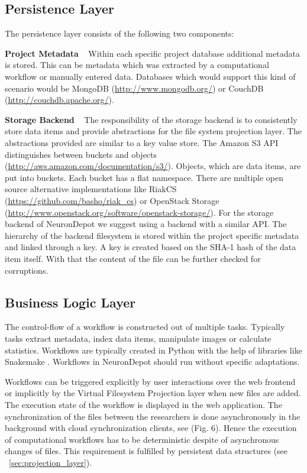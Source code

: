 \documentclass{frontiersSCNS} %
\begin{document}
\subsection{Persistence Layer}

The persistence layer consists of the following two components:

\textbf{Project Metadata} \texttt{  } Within each specific project database
additional metadata is stored. This can be metadata which was extracted by a
computational workflow or manually entered data. Databases which would support
this kind of scenario would be MongoDB (\url{http://www.mongodb.org/}) or
CouchDB (\url{http://couchdb.apache.org/}).

\textbf{Storage Backend} \texttt{  } The responsibility of the storage backend
is to consistently store data items and provide abstractions for the file
system projection layer. The abstractions provided are similar to a key value
store. The Amazon S3 API distinguishes between buckets and objects
(\url{http://aws.amazon.com/documentation/s3/}). Objects, which are data items,
are put into buckets. Each bucket has a flat namespace. There are multiple open
source alternative implementations like RiakCS
(\url{https://github.com/basho/riak\_cs}) or OpenStack Storage
(\url{http://www.openstack.org/software/openstack-storage/}). For the storage
backend of NeuronDepot we suggest using a backend with a similar API. The
hierarchy of the backend filesystem is stored within the project specific
metadata and linked through a key. A key is created based on the SHA-1 hash of
the data item itself. With that the content of the file can be further checked
for corruptions.


\subsection{Business Logic Layer}

The control-flow of a workflow is constructed out of multiple tasks. Typically
tasks extract metadata, index data items, manipulate images or calculate
statistics. Workflows are typically created in Python with the help of
libraries like Snakemake \citep{Koester2012}. Workflows in NeuronDepot should run
without specific adaptations.

Workflows can be triggered explicitly by user interactions over the web
frontend or implicitly by the Virtual Filesystem Projection layer when new
files are added. The execution state of the workflow is displayed in the web
application. The synchronization of the files between the researchers is done
asynchronously in the background with cloud synchronization clients, see (Fig.
6). Hence the execution of computational workflows  has to be deterministic
despite of asynchronous changes of files. This requirement is fulfilled by
persistent data structures (see ~\ref{sec:projection_layer}).
\end{document}
